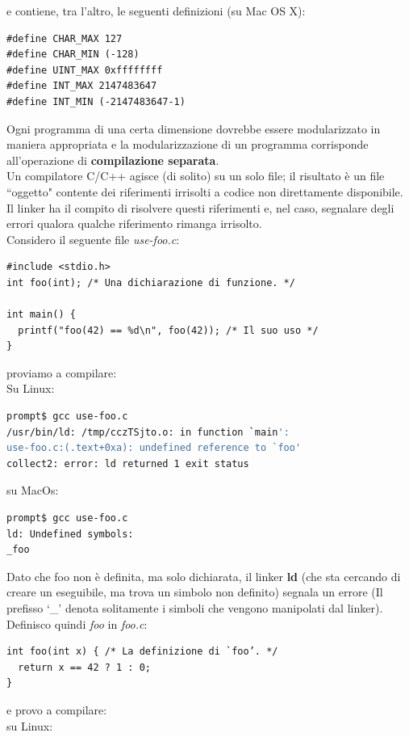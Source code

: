 \documentclass[a4paper,12pt, oneside]{book}
\begin{document}
e contiene, tra l’altro, le seguenti definizioni (su Mac OS X):
\begin{verbatim}
#define CHAR_MAX 127
#define CHAR_MIN (-128)
#define UINT_MAX 0xffffffff
#define INT_MAX 2147483647
#define INT_MIN (-2147483647-1)
\end{verbatim}
Ogni programma di una certa dimensione dovrebbe essere
modularizzato in maniera appropriata e la modularizzazione di un programma corrisponde
all'operazione di \textbf{compilazione separata}.\\
Un compilatore C/C++ agisce (di solito) su un solo file; il
risultato è un file “oggetto" contente dei riferimenti irrisolti a codice non direttamente disponibile. Il linker ha il compito di risolvere questi riferimenti e, nel caso,
segnalare degli errori qualora qualche riferimento rimanga
irrisolto.\\
Considero il seguente file \textit{use-foo.c}:
\begin{verbatim}
#include <stdio.h>
int foo(int); /* Una dichiarazione di funzione. */

int main() {
  printf("foo(42) == %d\n", foo(42)); /* Il suo uso */
}
\end{verbatim}
proviamo a compilare:\\
Su Linux:
\begin{shaded}
\begin{lstlisting}[language=bash]
prompt$ gcc use-foo.c 
/usr/bin/ld: /tmp/cczTSjto.o: in function `main':
use-foo.c:(.text+0xa): undefined reference to `foo'
collect2: error: ld returned 1 exit status
\end{lstlisting}
\end{shaded}
su MacOs:
\begin{shaded}
\begin{lstlisting}[language=bash]
prompt$ gcc use-foo.c
ld: Undefined symbols:
_foo
\end{lstlisting}
\end{shaded}
Dato che foo non è definita, ma solo dichiarata, il linker \textbf{ld} (che sta cercando di
creare un eseguibile, ma trova un simbolo non definito) segnala un errore (Il prefisso ‘\_’ denota solitamente i simboli che vengono manipolati dal linker).\\
Definisco quindi \textit{foo} in \textit{foo.c}:
\begin{verbatim}
int foo(int x) { /* La definizione di `foo’. */
  return x == 42 ? 1 : 0;
}
\end{verbatim}
e provo a compilare:\\
su Linux:
\end{document}
